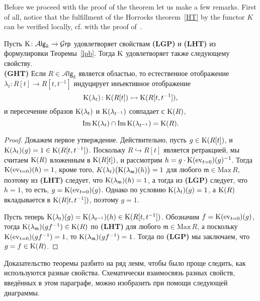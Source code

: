 \documentclass[oneside, 11pt]{amsart} \pdfoutput=1
\begin{document}
Before we proceed with the proof of the theorem let us make a few remarks.
First of all, notice that the fulfillment of the Horrocks theorem~\ref{HT} by the functor $K$ can be verified locally, cf. with the proof of~\cite[Theorem~1]{LS20}.
\begin{lemma}
\label{ght}
Пусть ${\mathrm{K}}\colon\mathcal A\mathsf{lg}_k\rightarrow\mathcal G\mathsf{rp}$ удовлетворяет свойствам {\bf(LGP)} и {\bf(LHT)} из формулировки Теоремы~\ref{lpb}. Тогда ${\mathrm{K}}$ удовлетворяет также следующему свойству.\\
{\rm\bf(GHT)} Если $R\in\mathcal A\mathsf{lg}_k$ является областью, то естественное отображение $\lambda_t\colon R[t]\rightarrow R[t,t^{-1}]$ индуцирует инъективное отображение 
$$
{\mathrm{K}}(\lambda_t)\colon{\mathrm{K}}(R[t])\rightarrowtail{\mathrm{K}}(R[t,t^{-1}]),
$$ 
и пересечение образов ${\mathrm{K}}(\lambda_t)$ и ${\mathrm{K}}(\lambda_{t^{-1}})$ совпадает с ${\mathrm{K}}(R)$, 
$$
\mathrm{Im}\,{\mathrm{K}}(\lambda_t)\cap\mathrm{Im}\,{\mathrm{K}}(\lambda_{t^{-1}}) = {\mathrm{K}}(R).
$$
\end{lemma}
\begin{proof}
Докажем первое утверждение. Действительно, пусть $g\in{\mathrm{K}}(R[t])$, и ${\mathrm{K}}(\lambda_t)(g)=1\in{\mathrm{K}}(R[t,t^{-1}])$. Поскольку $R\hookrightarrow R[t]$ является ретракцией, мы считаем ${\mathrm{K}}(R)$ вложенным в ${\mathrm{K}}(R[t])$, и рассмотрим $h=g\cdot{\mathrm{K}}(\mathrm{ev}_{t=0})(g)^{-1}$. Тогда ${\mathrm{K}}(\mathrm{ev}_{t=0})(h)=1$, кроме того, $K(\lambda_t)\big({\mathrm{K}}(\lambda_{\mathfrak m})(h)\big)=1$ для любого $\mathfrak m\in\mathrm{Max}\,R$, поэтому из {\bf(LHT)} следует, что ${\mathrm{K}}(\lambda_{\mathfrak m})(h)=1$, а тогда из {\bf(LGP)} следует, что $h=1$, то есть, $g={\mathrm{K}}(\mathrm{ev}_{t=0})(g)$. Однако по условию ${\mathrm{K}}(\lambda_t)(g)=1$, а ${\mathrm{K}}(R)$ вкладывается в ${\mathrm{K}}(R[t,t^{-1}])$, поэтому $g=1$.

Пусть теперь ${\mathrm{K}}(\lambda_t)(g)={\mathrm{K}}(\lambda_{t^{-1}})(h)\in{\mathrm{K}}(R[t,t^{-1}])$. Обозначим $f={\mathrm{K}}(\mathrm{ev}_{t=0})(g)$, тогда ${\mathrm{K}}(\lambda_{\mathfrak m})(gf^{-1})\in{\mathrm{K}}(R)$ по {\bf(LHT)} для любого $\mathfrak m\in\mathrm{Max}\,R$, а поскольку ${\mathrm{K}}(\mathrm{ev}_{t=0})(gf^{-1})=1$, то ${\mathrm{K}}(\lambda_{\mathfrak m})(gf^{-1})=1$. Тогда по {\bf(LGP)} мы заключаем, что $g=f\in{\mathrm{K}}(R)$.
\end{proof}


Доказательство теоремы разбито на ряд лемм, чтобы было проще следить, как используются разные свойства. Схематически взаимосвязь разных свойств, введённых в этом параграфе, можно изобразить при помощи следующей диаграммы.
\end{document}
